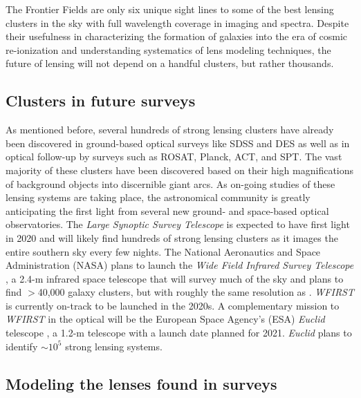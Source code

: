 The Frontier Fields are only six unique sight lines to some of the best lensing clusters in the sky with full wavelength coverage in imaging and spectra. Despite their usefulness in characterizing the formation of galaxies into the era of cosmic re-ionization and understanding systematics of lens modeling techniques, the future of lensing will not depend on a handful clusters, but rather thousands.

\subsection{Clusters in future surveys}

As mentioned before, several hundreds of strong lensing clusters have already been discovered in ground-based optical surveys like SDSS and DES as well as in optical follow-up by surveys such as ROSAT, Planck, ACT, and SPT. The vast majority of these clusters have been discovered based on their high magnifications of background objects into discernible giant arcs. As on-going studies of these lensing systems are taking place, the astronomical community is greatly anticipating the first light from several new ground- and space-based optical observatories. The {\it Large Synoptic Survey Telescope} \citep[{\it LSST}; ][]{IVezic:2008tv} is expected to have first light in 2020 and will likely find hundreds of strong lensing clusters as it images the entire southern sky every few nights. The National Aeronautics and Space Administration (NASA) plans to launch the {\it Wide Field Infrared Survey Telescope} \citep[{\it WFIRST}; ][]{Spergel:2013zk}, a 2.4-m infrared space telescope that will survey much of the sky and plans to find $>$40,000 galaxy clusters, but with roughly the same resolution as \hst. {\it WFIRST} is currently on-track to be launched in the 2020s. A complementary mission to {\it WFIRST} in the optical will be the European Space Agency's (ESA) {\it Euclid} telescope \citep{Laureijs:2011qt}, a 1.2-m telescope with a launch date planned for 2021. {\it Euclid} plans to identify $\sim10^5$ strong lensing systems.

\subsection{Modeling the lenses found in surveys}


